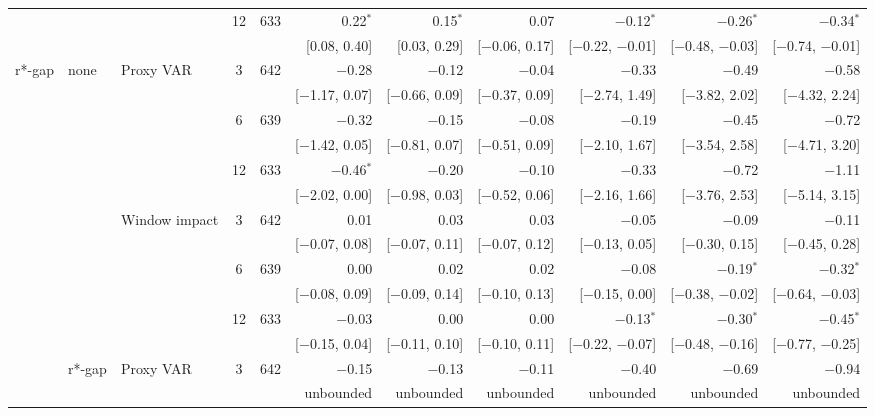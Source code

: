\begin{table}[tp]
{\begin{tabular}{lllcrrrrrrr}
 &  &  & 12 & 633 & 0.22$^{*}$ & 0.15$^{*}$ & 0.07 & $-$0.12$^{*}$ & $-$0.26$^{*}$ & $-$0.34$^{*}$\\
 & & & & & {\tiny [0.08, 0.40]} & {\tiny [0.03, 0.29]} & {\tiny [$-$0.06, 0.17]} & {\tiny [$-$0.22, $-$0.01]} & {\tiny [$-$0.48, $-$0.03]} & {\tiny [$-$0.74, $-$0.01]}\\
\addlinespace
r*-gap & none & Proxy VAR & 3 & 642 & $-$0.28 & $-$0.12 & $-$0.04 & $-$0.33 & $-$0.49 & $-$0.58\\
 & & & & & {\tiny [$-$1.17, 0.07]} & {\tiny [$-$0.66, 0.09]} & {\tiny [$-$0.37, 0.09]} & {\tiny [$-$2.74, 1.49]} & {\tiny [$-$3.82, 2.02]} & {\tiny [$-$4.32, 2.24]}\\
 &  &  & 6 & 639 & $-$0.32 & $-$0.15 & $-$0.08 & $-$0.19 & $-$0.45 & $-$0.72\\
 & & & & & {\tiny [$-$1.42, 0.05]} & {\tiny [$-$0.81, 0.07]} & {\tiny [$-$0.51, 0.09]} & {\tiny [$-$2.10, 1.67]} & {\tiny [$-$3.54, 2.58]} & {\tiny [$-$4.71, 3.20]}\\
 &  &  & 12 & 633 & $-$0.46$^{*}$ & $-$0.20 & $-$0.10 & $-$0.33 & $-$0.72 & $-$1.11\\
 & & & & & {\tiny [$-$2.02, 0.00]} & {\tiny [$-$0.98, 0.03]} & {\tiny [$-$0.52, 0.06]} & {\tiny [$-$2.16, 1.66]} & {\tiny [$-$3.76, 2.53]} & {\tiny [$-$5.14, 3.15]}\\
 &  & Window impact & 3 & 642 & 0.01 & 0.03 & 0.03 & $-$0.05 & $-$0.09 & $-$0.11\\
 & & & & & {\tiny [$-$0.07, 0.08]} & {\tiny [$-$0.07, 0.11]} & {\tiny [$-$0.07, 0.12]} & {\tiny [$-$0.13, 0.05]} & {\tiny [$-$0.30, 0.15]} & {\tiny [$-$0.45, 0.28]}\\
 &  &  & 6 & 639 & 0.00 & 0.02 & 0.02 & $-$0.08 & $-$0.19$^{*}$ & $-$0.32$^{*}$\\
 & & & & & {\tiny [$-$0.08, 0.09]} & {\tiny [$-$0.09, 0.14]} & {\tiny [$-$0.10, 0.13]} & {\tiny [$-$0.15, 0.00]} & {\tiny [$-$0.38, $-$0.02]} & {\tiny [$-$0.64, $-$0.03]}\\
 &  &  & 12 & 633 & $-$0.03 & 0.00 & 0.00 & $-$0.13$^{*}$ & $-$0.30$^{*}$ & $-$0.45$^{*}$\\
 & & & & & {\tiny [$-$0.15, 0.04]} & {\tiny [$-$0.11, 0.10]} & {\tiny [$-$0.10, 0.11]} & {\tiny [$-$0.22, $-$0.07]} & {\tiny [$-$0.48, $-$0.16]} & {\tiny [$-$0.77, $-$0.25]}\\
 & r*-gap & Proxy VAR & 3 & 642 & $-$0.15 & $-$0.13 & $-$0.11 & $-$0.40 & $-$0.69 & $-$0.94\\
 & & & & & {\tiny unbounded} & {\tiny unbounded} & {\tiny unbounded} & {\tiny unbounded} & {\tiny unbounded} & {\tiny unbounded}\\

\end{tabular}}
\end{table}
